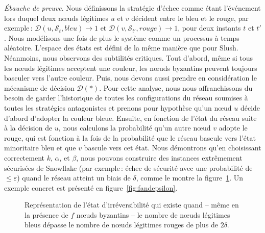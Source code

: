 \documentclass[a4,twocolumn,10pt]{article}
\theoremstyle{definition}
\begin{document}
\noindent \emph{Ébauche de preuve}. Nous définissons la stratégie d'échec comme étant l'événement lors duquel deux
nœuds légitimes $u$ et $v$ décident entre le bleu et le rouge, par exemple\,: $\mathcal{D}(u, \mathcal{S}_t, bleu) \rightarrow 1$
et $\mathcal{D}(v, \mathcal{S}_{t'}, rouge) \rightarrow 1$, pour deux instants $t$ et $t'$. Nous modélisons une fois de
plus le système comme un processus à temps aléatoire. L'espace des états est défini de la même manière que pour Slush.
Néanmoins, nous observons des subtilités critiques. Tout d'abord, même si tous les nœuds légitimes acceptent une
couleur, les nœuds byzantins peuvent toujours basculer vers l'autre couleur. Puis, nous devons aussi prendre en
considération le mécanisme de décision $\mathcal{D}(*)$. Pour cette analyse, nous nous affranchissons du besoin de
garder l'historique de toutes les configurations du réseau soumises à toutes les stratégies antagonistes et prenons pour
hypothèse qu'un nœud $u$ décide d'abord d'adopter la couleur bleue. Ensuite, en fonction de l'état du réseau suite à la
décision de $u$, nous calculons la probabilité qu'un autre nœud $v$ adopte le rouge, qui est fonction à la fois de la
probabilité que le réseau bascule vers l'état minoritaire bleu et que $v$ bascule vers cet état.
Nous démontrons qu'en choisissant correctement $k$, $\alpha$, et $\beta$, nous pouvons construire des instances
extrêmement sécurisées de Snowflake (par exemple\,: échec de sécurité avec une probabilité de $\leq \varepsilon$) quand le réseau
atteint un biais de $\delta$, comme le montre la figure~\ref{fig:states_feasible_solutions}. Un exemple concret est
présenté en figure~\ref{fig:fandepsilon}.

\begin{figure}[h]
\begin{center}

\caption{Représentation de l'état d'irréversibilité qui existe quand -- même en la présence de $f$ nœuds byzantins --
  le nombre de nœuds légitimes bleus dépasse le nombre de nœuds légitimes rouges de plus de $2\delta$.
}
\label{fig:states_feasible_solutions}
\end{center}
\end{figure}
\end{document}
